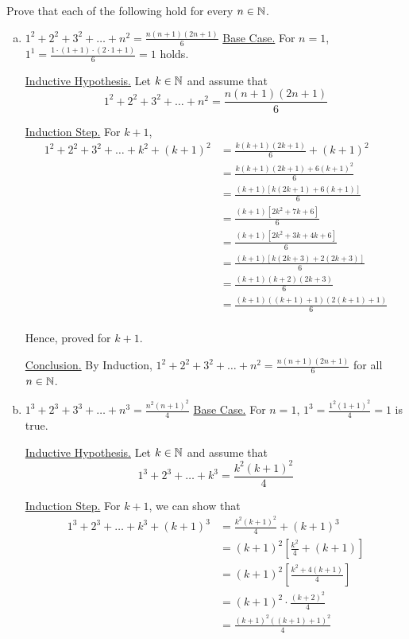 \bp Prove that each of the following hold for every $n \in \mathbb{N}$.
\begin{enumerate}[(a).]
	\item $\displaystyle 1^2 + 2^2 + 3^2 + \ldots + n^2 = \frac{n(n+1)(2n+1)}{6}$
		\bs
		\underline{Base Case.} 
		For $n = 1$, $1^1 = \frac{1 \cdot (1 + 1) \cdot ( 2 \cdot 1 + 1)}{6} = 1$ holds.
		
		\underline{Inductive Hypothesis.} Let $k \in \mathbb{N}$ and assume that 
		$$1^2 + 2^2 + 3^2 + \ldots + n^2 = \frac{n(n+1)(2n+1)}{6}$$

		\underline{Induction Step.} For $k+1$,
		\begin{align*}
			1^2 + 2^2 + 3^2 + \ldots + k^2 + (k+1)^2
				&= \frac{k(k+1)(2k+1)}{6} + (k+1)^2 \\
				&= \frac{k(k+1)(2k+1) + 6(k+1)^2}{6} \\
				&= \frac{(k+1)[k(2k+1) + 6(k+1)]}{6} \\
				&= \frac{(k+1)[2k^2 + 7k + 6]}{6} \\
				&= \frac{(k+1)[2k^2 + 3k + 4k + 6]}{6} \\
				&= \frac{(k+1)[k(2k+3) + 2(2k+3)]}{6} \\
				&= \frac{(k+1)(k+2)(2k+3)}{6} \\
				&= \frac{(k+1)((k+1)+1)(2(k+1)+1)}{6} \\
		\end{align*}

		Hence, proved for $k+1$.

		\underline{Conclusion.} By Induction, $1^2 + 2^2 + 3^2 + \ldots + n^2 = \frac{n(n+1)(2n+1)}{6}$ for all $n \in \mathbb{N}$.
		\es

	\item $\displaystyle 1^3 + 2^3 + 3^3 + \ldots + n^3 = \frac{n^2 (n+1)^2}{4}$
		\bs
		\underline{Base Case.} For $n = 1$, $1^3 =  \frac{1^2 (1+1)^2}{4} = 1$ is true.

		\underline{Inductive Hypothesis.} Let $k \in \mathbb{N}$ and assume that 
		$$1^3 + 2^3 + \ldots + k^3 = \frac{k^2 (k+1)^2}{4}$$

		\underline{Induction Step.} For $k+1$, we can show that
		\begin{align*}
			1^3 + 2^3 + \ldots + k^3 + (k+1)^3
				&= \frac{k^2 (k+1)^2}{4} + (k+1)^3 \\
				&= (k+1)^2 \left[ \frac{k^2}{4} + (k+1) \right] \\
				&= (k+1)^2 \left[ \frac{k^2 + 4(k+1)}{4} \right] \\
				&= (k+1)^2 \cdot \frac{(k+2)^2}{4} \\
				&= \frac{(k+1)^2 ((k+1)+1)^2}{4}
		\end{align*}


\end{enumerate}
